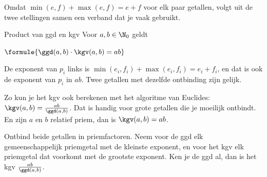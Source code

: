 Omdat $\min(e, f) + \max(e, f) = e + f$ voor elk paar getallen, volgt uit de twee stellingen samen een verband dat je vaak gebruikt.

\begin{theorie}
\begin{stelling}{Product van ggd en kgv}
Voor $a, b \in \N_0$ geldt

\vspace{1mm}
\qquad $\formule{\ggd(a, b) \cdot \kgv(a, b) = ab}$
\end{stelling}

\begin{bewijs}
De exponent van $p_i$ links is $\min(e_i, f_i) + \max(e_i, f_i) = e_i + f_i$, en dat is ook de exponent van $p_i$ in $ab$. Twee getallen met dezelfde ontbinding zijn gelijk.
\end{bewijs}
\end{theorie}

Zo kun je het kgv ook berekenen met het algoritme van Euclides: $\kgv(a, b) = \tfrac{ab}{\ggd(a, b)}$. Dat is handig voor grote getallen die je moeilijk ontbindt. En zijn $a$ en $b$ relatief priem, dan is $\kgv(a, b) = ab$.


\begin{werkwijze}
Ontbind beide getallen in priemfactoren. Neem voor de ggd elk gemeenschappelijk priemgetal met de kleinste exponent, en voor het kgv elk priemgetal dat voorkomt met de grootste exponent. Ken je de ggd al, dan is het kgv $\tfrac{ab}{\ggd(a, b)}$.
\end{werkwijze}

